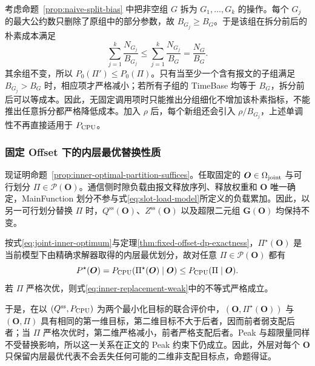 \documentclass[UTF8,a4paper,twoside,zihao=-4]{ctexart}
\numberwithin{equation}{section}
\numberwithin{figure}{section}
\numberwithin{table}{section}
\theoremstyle{definition}
\numberwithin{algocf}{section}
\begin{document}
考虑命题~\ref{prop:naive-split-bias} 中把非空组 $G$ 拆为
$G_1,\ldots,G_k$ 的操作。每个 $G_j$ 的最大公约数只删除了原组中的部分参数，故
$B_{G_j}\ge B_G$。于是该组在拆分前后的朴素成本满足
\[
 \sum_{j=1}^{k}\frac{N_{G_j}}{B_{G_j}}
 \le
 \sum_{j=1}^{k}\frac{N_{G_j}}{B_G}
 =
 \frac{N_G}{B_G}.
\]
其余组不变，所以 $P_0(\Pi')\le P_0(\Pi)$。只有当至少一个含有报文的子组满足
$B_{G_j}>B_G$ 时，相应项才严格减小；若所有子组的 TimeBase 均等于 $B_G$，拆分前后可以等成本。因此，无固定调用项时只能推出分组细化不增加该朴素指标，不能推出任意拆分都严格降低成本。加入 $\rho$ 后，每个新组还会引入 $\rho/B_{G_j}$，上述单调性不再直接适用于 $P_{\rm CPU}$。

\subsubsection{固定 Offset 下的内层最优替换性质}
\label{subsec:appendix-inner-replacement-proof}

现证明命题~\ref{prop:inner-optimal-partition-suffices}。任取固定的 $\boldsymbol O\in\Omega_{\rm joint}$ 与可行划分 $\Pi\in\mathcal P(\boldsymbol O)$。通信侧时隙负载由报文释放序列、释放权重和 $\boldsymbol O$ 唯一确定，MainFunction 划分不参与式\eqref{eq:slot-load-model}所定义的负载累加。因此，以另一可行划分替换 $\Pi$ 时，$Q^{\mathrm{ss}}(\boldsymbol O)$、$Z^{\mathrm{ss}}(\boldsymbol O)$ 以及超限二元组 $\boldsymbol G(\boldsymbol O)$ 均保持不变。

按式\eqref{eq:joint-inner-optimum}与定理\ref{thm:fixed-offset-dp-exactness}，$\Pi^\star(\boldsymbol O)$ 是当前模型下由精确求解器取得的内层最优划分，故对任意 $\Pi\in\mathcal P(\boldsymbol O)$ 都有
\begin{equation}
 P^\star(\boldsymbol O)
 =P_{\rm CPU}(\Pi^\star(\boldsymbol O)\mid\boldsymbol O)
 \le P_{\rm CPU}(\Pi\mid\boldsymbol O).
\label{eq:inner-replacement-weak}
\end{equation}
若 $\Pi$ 严格次优，则式\eqref{eq:inner-replacement-weak}中的不等式严格成立。

于是，在以 $(Q^{\mathrm{ss}},P_{\rm CPU})$ 为两个最小化目标的联合评价中，$(\boldsymbol O,\Pi^\star(\boldsymbol O))$ 与 $(\boldsymbol O,\Pi)$ 具有相同的第一维目标，第二维目标不大于后者，因而前者弱支配后者；当 $\Pi$ 严格次优时，第二维严格减小，前者严格支配后者。Peak 与超限量同样不受替换影响，所以这一关系在正文的 Peak 约束下仍成立。因此，外层对每个 $\boldsymbol O$ 只保留内层最优代表不会丢失任何可能的二维非支配目标点，命题得证。

\clearpage

\end{document}
